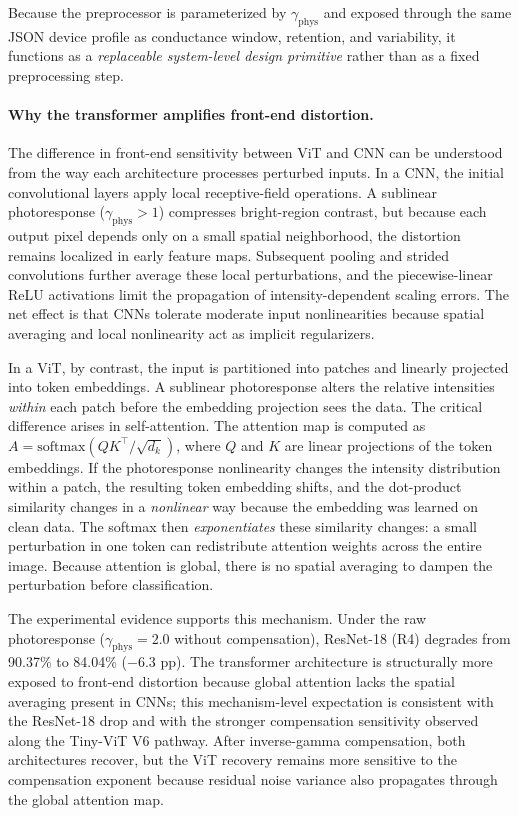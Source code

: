Because the preprocessor is parameterized by $\gamma_{\text{phys}}$ and exposed through the same JSON device profile as conductance window, retention, and variability, it functions as a \emph{replaceable system-level design primitive} rather than as a fixed preprocessing step.

\paragraph{Why the transformer amplifies front-end distortion.}
The difference in front-end sensitivity between ViT and CNN can be understood from the way each architecture processes perturbed inputs. In a CNN, the initial convolutional layers apply local receptive-field operations. A sublinear photoresponse ($\gamma_{\text{phys}} > 1$) compresses bright-region contrast, but because each output pixel depends only on a small spatial neighborhood, the distortion remains localized in early feature maps. Subsequent pooling and strided convolutions further average these local perturbations, and the piecewise-linear ReLU activations limit the propagation of intensity-dependent scaling errors. The net effect is that CNNs tolerate moderate input nonlinearities because spatial averaging and local nonlinearity act as implicit regularizers.

In a ViT, by contrast, the input is partitioned into patches and linearly projected into token embeddings. A sublinear photoresponse alters the relative intensities \emph{within} each patch before the embedding projection sees the data. The critical difference arises in self-attention. The attention map is computed as $A = \text{softmax}(QK^{\top}/\sqrt{d_k})$, where $Q$ and $K$ are linear projections of the token embeddings. If the photoresponse nonlinearity changes the intensity distribution within a patch, the resulting token embedding shifts, and the dot-product similarity changes in a \emph{nonlinear} way because the embedding was learned on clean data. The softmax then \emph{exponentiates} these similarity changes: a small perturbation in one token can redistribute attention weights across the entire image. Because attention is global, there is no spatial averaging to dampen the perturbation before classification.

The experimental evidence supports this mechanism. Under the raw photoresponse ($\gamma_{\text{phys}}=2.0$ without compensation), ResNet-18 (R4) degrades from 90.37\% to 84.04\% ($-$6.3 pp). The transformer architecture is structurally more exposed to front-end distortion because global attention lacks the spatial averaging present in CNNs; this mechanism-level expectation is consistent with the ResNet-18 drop and with the stronger compensation sensitivity observed along the Tiny-ViT V6 pathway. After inverse-gamma compensation, both architectures recover, but the ViT recovery remains more sensitive to the compensation exponent because residual noise variance also propagates through the global attention map.

